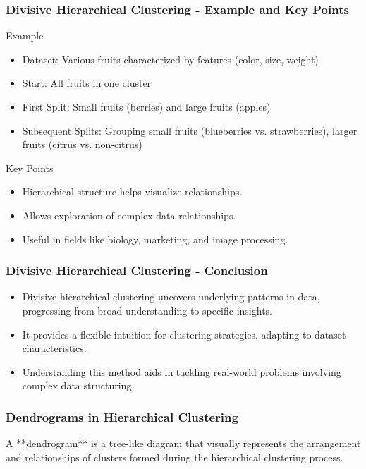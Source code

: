 \documentclass[aspectratio=169]{beamer}
\begin{document}
\begin{frame}[fragile]
    \frametitle{Divisive Hierarchical Clustering - Example and Key Points}
    \begin{block}{Example}
        \begin{itemize}
            \item Dataset: Various fruits characterized by features (color, size, weight)
            \item Start: All fruits in one cluster
            \item First Split: Small fruits (berries) and large fruits (apples)
            \item Subsequent Splits: Grouping small fruits (blueberries vs. strawberries), larger fruits (citrus vs. non-citrus)
        \end{itemize}
    \end{block}
    \begin{block}{Key Points}
        \begin{itemize}
            \item Hierarchical structure helps visualize relationships.
            \item Allows exploration of complex data relationships.
            \item Useful in fields like biology, marketing, and image processing.
        \end{itemize}
    \end{block}
\end{frame}

\begin{frame}[fragile]
    \frametitle{Divisive Hierarchical Clustering - Conclusion}
    \begin{itemize}
        \item Divisive hierarchical clustering uncovers underlying patterns in data, progressing from broad understanding to specific insights.
        \item It provides a flexible intuition for clustering strategies, adapting to dataset characteristics.
        \item Understanding this method aids in tackling real-world problems involving complex data structuring.
    \end{itemize}
\end{frame}

\begin{frame}[fragile]
    \frametitle{Dendrograms in Hierarchical Clustering}
    A **dendrogram** is a tree-like diagram that visually represents the arrangement and relationships of clusters formed during the hierarchical clustering process.
\end{frame}
\end{document}
